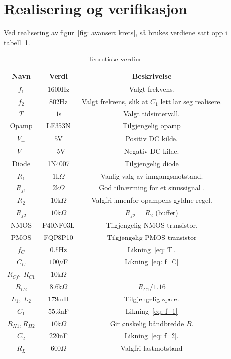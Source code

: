 \documentclass[a4paper,11pt,norsk]{article}
\begin{document}
\newpage
\section{Realisering og verifikasjon}
\label{sec: realisering}
Ved realisering av figur~\ref{fig: avansert krets}, så brukes verdiene satt opp i tabell~\ref{table: komponentverdier}. \\
\begin{table}[!htbp]
    \centering
    \begin{tabular}{|c|c|c|}
    \hline
    \textbf{Navn} & \textbf{Verdi} & \textbf{Beskrivelse} \\
    \hline
    $f_1$ & $1600$Hz & Valgt frekvens. \\
    \hline
    $f_2$ & $802$Hz & Valgt frekvens, slik at $C_1$ lett lar seg realisere.\\
    \hline
    $T$ & $1$s & Valgt tidsintervall. \\
    \hline
    Opamp & LF353N & Tilgjengelig opamp \\
    \hline
    $V_+$ & $5$V & Positiv DC kilde. \\
    \hline
    $V_-$ & $-5$V & Negativ DC kilde. \\
    \hline
    Diode & 1N4007 & Tilgjengelig diode \\
    \hline
    $R_1$ & $1$k$\Omega$ & Vanlig valg av inngangsmotstand. \\
    \hline
    $R_{f1}$ & $2$k$\Omega$ & God tilnærming for et sinussignal \cite{U-oscillator}. \\
    \hline
    $R_2$ & $10$k$\Omega$ & Valgfri innenfor opampens gyldne regel. \\
    \hline
    $R_{f2}$ & $10$k$\Omega$ & $R_{f2} = R_2$ (buffer) \\
    \hline
    NMOS & P40NF03L & Tilgjengelig NMOS transistor. \\
    \hline
    PMOS & FQP8P10 & Tilgjengelig PMOS transistor \\
    \hline
    $f_C$ & $0.5$Hz & Likning~\ref{eq: T}. \\
    \hline
    $C_{C}$ & $100\mu$F & Likning~\ref{eq: f_C} \\
    \hline
    $R_{Cf}, \: R_{C1}$ & $10$k$\Omega$ & \\
    \hline
    $R_{C2}$ & $8.6$k$\Omega$ & $R_{C1}/1.16$ \\
    \hline
    $L_1, \: L_2$ & $179$mH & Tilgjengelig spole.\\
    \hline
    $C_1$ & $55.3$nF & Likning~\ref{eq: f_1} \\
    \hline
    $R_{H1}, R_{H2}$ & $10$k$\Omega$ & Gir ønskelig båndbredde $B$.\\
    \hline
    $C_2$ & $220$nF & Likning~\ref{eq: f_2}.  \\
    \hline
    $R_L$ & $600\Omega$ & Valgfri lastmotstand \\
    \hline
    \end{tabular}
    \caption{Teoretiske verdier}
    \label{table: komponentverdier}
\end{table}\\
\end{document}
